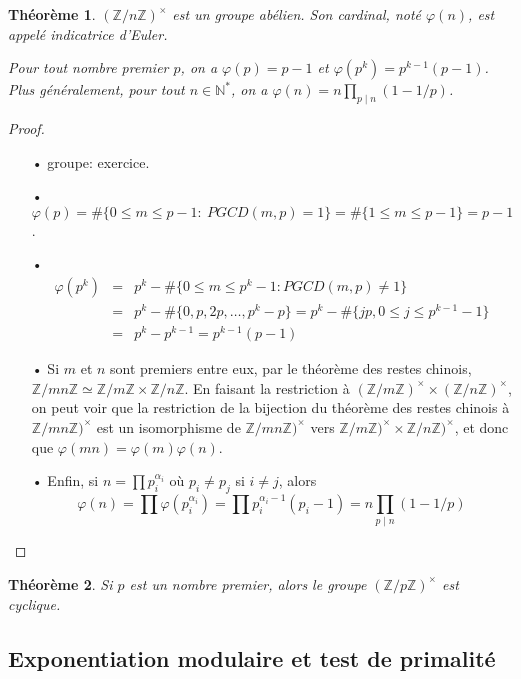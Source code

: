 \documentclass[10pt,a4paper]{report}
\newtheorem{thm}{Théorème}[chapter]
\begin{document}
\begin{thm}
$(\mathbb{Z}/n \mathbb{Z})^{\times}$ est un groupe abélien. Son cardinal, noté $\varphi(n)$, est appelé indicatrice d'Euler.\par 
Pour tout nombre premier $p$, on a $\varphi(p)=p-1$ et $\varphi(p^k)=p^{k-1}(p-1)$. Plus généralement, pour tout $n \in \mathbb{N}^*$, on a $\varphi(n)= n \prod_{p \mid n}(1-1/p)$.
\end{thm}

\begin{proof}\
\begin{itemize}
\item[•] groupe: exercice.
\item[•] $\varphi(p)= \# \{ 0\leqslant m \leqslant p-1: \ PGCD(m,p)=1   \}= \# \{  1\leqslant m \leqslant p-1 \}=p-1$.
\item[•]\begin{eqnarray*}
\varphi(p^k) &=& p^k - \#  \{ 0 \leqslant m \leqslant p^k-1 : PGCD(m,p)\neq 1  \}\\
                     &=& p^k-  \# \{  0,p,2p,\ldots, p^k-p  \}=p^k- \#  \{  jp, 0 \leqslant j \leqslant p^{k-1}-1 \} \\
                     &=& p^k - p^{k-1} = p^{k-1}(p-1)
\end{eqnarray*}
\item[•] Si $m$ et $n$ sont premiers entre eux, par le théorème des restes chinois, $\mathbb{Z}/mn \mathbb{Z}\simeq \mathbb{Z}/m \mathbb{Z} \times \mathbb{Z}/n \mathbb{Z}$. En faisant la restriction à $(\mathbb{Z}/m \mathbb{Z})^{\times} \times (\mathbb{Z}/n \mathbb{Z})^{\times}$, on peut voir que la restriction de la bijection du théorème des restes chinois à $\mathbb{Z}/mn \mathbb{Z})^{ \times}$ est un isomorphisme de $\mathbb{Z}/mn \mathbb{Z})^{ \times}$ vers $\mathbb{Z}/m \mathbb{Z})^{ \times} \times \mathbb{Z}/n \mathbb{Z})^{ \times} $, et donc que $\varphi(mn)= \varphi(m) \varphi(n)$.
\item[•]Enfin, si $n= \prod p_i^{\alpha_i}$ où $p_i \neq p_j$ si $i\neq j$, alors 
$$ \varphi(n)= \prod \varphi(p_i^{\alpha_i})= \prod p_i^{\alpha_i-1}(p_i-1)=n \prod_{p \mid n} (1-1/p) $$ 
\end{itemize}
\end{proof}


\begin{thm}
Si $p$ est un nombre premier, alors le groupe $(\mathbb{Z}/p \mathbb{Z})^{\times}$ est cyclique.
\end{thm}

\subsection{Exponentiation modulaire et test de primalité}
\end{document}
